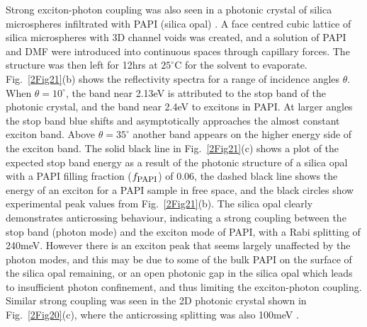Strong exciton-photon coupling was also seen in a photonic crystal of silica microspheres infiltrated with PAPI (silica opal) \cite{Sumioka2001}. A face centred cubic lattice of silica microspheres with 3D channel voids was created, and a solution of PAPI and DMF were introduced into continuous spaces through capillary forces. The structure was then left for 12hrs at $25^{\circ}$C for the solvent to evaporate. Fig.\ \ref{2Fig21}(b) shows the reflectivity spectra for a range of incidence angles $\theta$. When $\theta=10^{\circ}$, the band near 2.13eV is attributed to the stop band of the photonic crystal, and the band near 2.4eV to excitons in PAPI. At larger angles the stop band blue shifts and asymptotically approaches the almost constant exciton band. Above $\theta=35^{\circ}$ another band appears on the higher energy side of the exciton band. The solid black line in Fig.\ \ref{2Fig21}(c) shows a plot of the expected stop band energy as a result of the photonic structure of a silica opal with a PAPI filling fraction ($f_{\textrm{\footnotesize PAPI}}$) of 0.06, the dashed black line shows the energy of an exciton for a PAPI sample in free space, and the black circles show experimental peak values from Fig.\ \ref{2Fig21}(b). The silica opal clearly demonstrates anticrossing behaviour, indicating a strong coupling between the stop band (photon mode) and the exciton mode of PAPI, with a Rabi splitting of 240meV. However there is an exciton peak that seems largely unaffected by the photon modes, and this may be due to some of the bulk PAPI on the surface of the silica opal remaining, or an open photonic gap in the silica opal which leads to insufficient photon confinement, and thus limiting the exciton-photon coupling. Similar strong coupling was seen in the 2D photonic crystal shown in Fig.\ \ref{2Fig20}(c), where the anticrossing splitting was also 100meV \cite{Ishi-Hayase2003}. 
